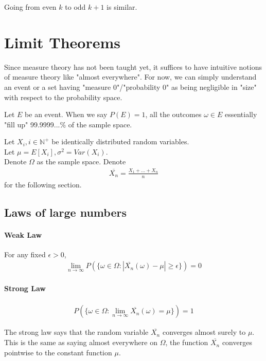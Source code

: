 \documentclass{article}
\begin{document}
Going from even $k$ to odd $k+1$ is similar.


\section{Limit Theorems}
Since measure theory has not been taught yet, it suffices to have intuitive notions of measure theory like "almost everywhere". For now, we can simply understand an event or a set having "measure 0"/"probability 0" as being negligible in "size" with respect to the probability space.

Let $E$ be an event. When we say $P(E)=1$, all the outcomes $\omega \in E$ essentially "fill up" 99.9999...\% of the sample space.

Let $X_i, i\in \mathbb{N}^+$ be identically distributed random variables.\\
Let $\mu = E[X_i], \sigma^2 = Var(X_i)$.\\
Denote $\Omega$ as the sample space.
Denote 
\begin{align*}
\overline{X_n} = \frac{X_1+\dots + X_n}{n}
\end{align*}
for the following section.

\subsection{Laws of large numbers}
\paragraph{Weak Law}
For any fixed $\epsilon > 0$,
\begin{align*}
	\lim_{n\rightarrow \infty}P(\{\omega \in \Omega: |\overline{X_n}(\omega)-\mu|\geq \epsilon \}) = 0
\end{align*}

\paragraph{Strong Law}
\begin{align*}
	P(\{\omega \in \Omega: \lim_{n\rightarrow \infty}\overline{X_n}(\omega) = \mu \}) = 1
\end{align*}

The strong law says that the random variable $\overline{X_n}$ converges almost surely to $\mu$. This is the same as saying almost everywhere on $\Omega$, the function $\overline{X_n}$ converges pointwise to the constant function $\mu$.
\end{document}

